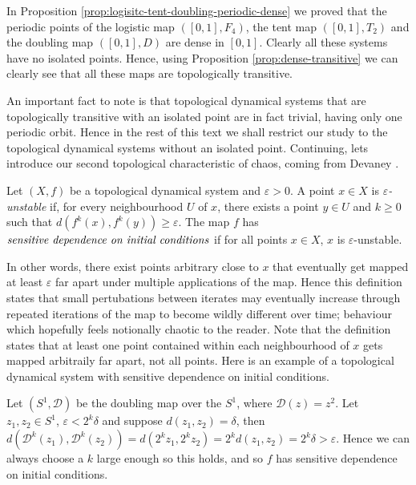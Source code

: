 \begin{exmp} \label{exmp:logistic-tent-doubling-transitive}
    In Proposition \ref{prop:logisitc-tent-doubling-periodic-dense} we proved that the periodic points of the logistic map $([0, 1], F_4)$, the tent map $([0, 1], T_2)$ and the doubling map $([0, 1], D)$ are dense in $[0, 1]$. Clearly all these systems have no isolated points. Hence, using Proposition \ref{prop:dense-transitive} we can clearly see that all these maps are topologically transitive.
\end{exmp}

An important fact to note is that topological dynamical systems that are topologically transitive with an isolated point are in fact trivial, having only one periodic orbit. Hence in the rest of this text we shall restrict our study to the topological dynamical systems without an isolated point. Continuing, lets introduce our second topological characteristic of chaos, coming from Devaney \cite{devaney}.

\begin{defn} \label{defn:sensitive-dependence}
    Let $(X, f)$ be a topological dynamical system and $\varepsilon > 0$. A point $x \in X$ is \emph{$\varepsilon$-unstable} if, for every neighbourhood $U$ of $x$, there exists a point $y \in U$ and $k \geq 0$ such that $d\left(f^k(x), f^k(y)\right) \geq \varepsilon$. The map $f$ has $\emph{sensitive dependence on initial conditions}$ if for all points $x \in X$, $x$ is $\varepsilon$-unstable.
\end{defn}

In other words, there exist points arbitrary close to $x$ that eventually get mapped at least $\varepsilon$ far apart under multiple applications of the map. Hence this definition states that small pertubations between iterates may eventually increase through repeated iterations of the map to become wildly different over time; behaviour which hopefully feels notionally chaotic to the reader. Note that the definition states that at least one point contained within each neighbourhood of $x$ gets mapped arbitraily far apart, not all points. Here is an example of a topological dynamical system with sensitive dependence on initial conditions.

\begin{exmp} \label{exmp:doubling-map-s1-sensitive}
    Let $(S^1, \mathcal{D})$ be the doubling map over the $S^1$, where $\mathcal{D}(z) = z^2$. Let $z_1, z_2 \in S^1$, $\varepsilon < 2^k \delta$ and suppose $d(z_1, z_2) = \delta$, then $d\left(\mathcal{D}^k(z_1), \mathcal{D}^k(z_2)\right) =  d\left(2^kz_1, 2^kz_2\right) = 2^k d(z_1, z_2) = 2^k \delta > \varepsilon$. Hence we can always choose a $k$ large enough so this holds, and so $f$ has sensitive dependence on initial conditions.
\end{exmp}

